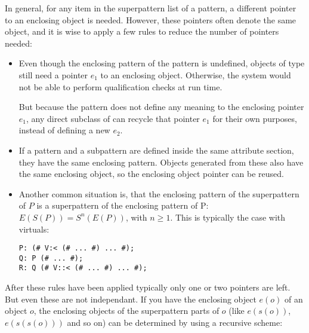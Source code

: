 In general, for any item in the superpattern list of a pattern, a
different pointer to an enclosing object is needed.  However,
these pointers often denote the same object, and it is wise to
apply a few rules to reduce the number of pointers needed:
\begin{itemize}
\item Even though the enclosing pattern of the 
    pattern is undefined, objects of type  still need
    a pointer $e_1$ to an enclosing object.  Otherwise, the
    system would not be able to perform qualification checks at
    run time.

    But because the  pattern does not define any
    meaning to the enclosing pointer $e_1$, any direct subclass
    of  can recycle that pointer $e_1$ for their
    own purposes, instead of defining a new $e_2$.

\item If a pattern and a subpattern are defined inside the same
    attribute section, they have the same enclosing pattern.
    Objects generated from these also have the same enclosing
    object, so the enclosing object pointer can be reused.

\item Another common situation is, that the enclosing pattern of
    the superpattern of $P$ is a superpattern of the enclosing
    pattern of P: $E(S(P)) = S^n(E(P))$, with $n \ge 1$.
    This is typically the case with virtuals:
    \beq\begin{verbatim}P: (# V:< (# ... #) ... #);
Q: P (# ... #);
R: Q (# V::< (# ... #) ... #);
\end{verbatim}\eeq
\end{itemize}
After these rules have been applied typically only one or two
pointers are left.  But even these are not independant.  If you
have the enclosing object $e(o)$ of an object $o$, the enclosing
objects of the superpattern parts of $o$ (like $e(s(o))$,
$e(s(s(o)))$ and so on) can be determined by using a
recursive scheme:
